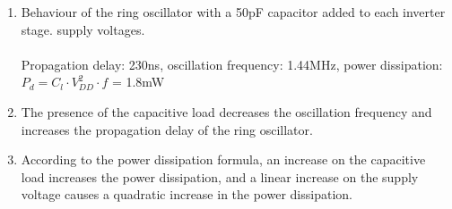 \documentclass{article}
\begin{document}
\begin{enumerate}
			\item Behaviour of the ring oscillator with a 50pF capacitor added to each inverter stage.
			supply voltages.\\\\
			Propagation delay: 230ns, oscillation frequency: 1.44MHz, power dissipation: \(P_d=C_l\cdot V_{DD}^2 \cdot f\) = 1.8mW
			\item The presence of the capacitive load decreases the oscillation frequency and increases the propagation delay of the ring oscillator.
			\item According to the power dissipation formula, an increase on the capacitive load increases the power dissipation, and a linear increase on the supply voltage causes a quadratic increase in the power dissipation.
		\end{enumerate}
\end{document}
